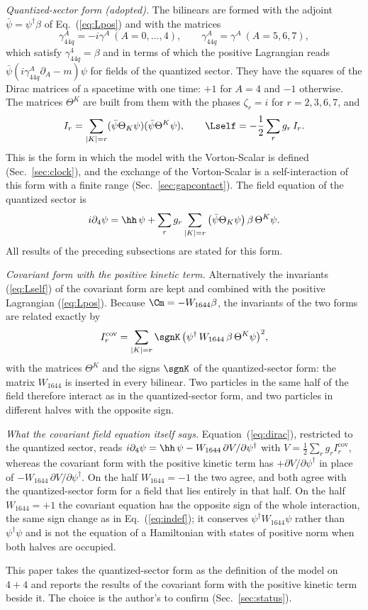 \emph{Quantized-sector form (adopted).} The bilinears are formed with the adjoint
$\bar\psi=\psi^\dagger\beta$ of Eq.~(\ref{eq:Lpos}) and with the matrices
\begin{equation}
\gamma_{44q}^{A}=-i\gamma^{A}\ (A=0,\dots,4),\qquad\gamma_{44q}^{A}=\gamma^{A}\ (A=5,6,7),
\label{eq:gq}
\end{equation}
which satisfy $\gamma_{44q}^{4}=\beta$ and in terms of which the positive Lagrangian reads
$\bar\psi(i\gamma_{44q}^{A}\partial_A-m)\psi$ for fields of the quantized sector. They have the squares
of the Dirac matrices of a spacetime with one time: $+1$ for $A=4$ and $-1$ otherwise. The matrices
$\Theta^{K}$ are built from them with the phases $\zeta_r=i$ for $r=2,3,6,7$, and
\begin{equation}
I_r=\sum_{|K|=r}(\bar\psi\Theta_K\psi)(\bar\psi\Theta^{K}\psi),\qquad\Lself=-\frac12\sum_rg_r\,I_r .
\label{eq:LselfQ}
\end{equation}
This is the form in which the model with the Vorton-Scalar is defined (Sec.~\ref{sec:clock}), and
the exchange of the Vorton-Scalar is a self-interaction of this form with a finite range
(Sec.~\ref{sec:gapcontact}). The field equation of the quantized sector is
\begin{equation}
i\partial_4\psi=\hh\,\psi+\sum_rg_r\sum_{|K|=r}\big(\bar\psi\Theta_K\psi\big)\,\beta\,\Theta^{K}\psi .
\label{eq:fieldQ}
\end{equation}
All results of the preceding subsections are stated for this form.

\emph{Covariant form with the positive kinetic term.} Alternatively the invariants (\ref{eq:Lself}) of
the covariant form are kept and combined with the positive Lagrangian (\ref{eq:Lpos}). Because
$\Cm=-W_{1644}\beta$, the invariants of the two forms are related exactly by
\begin{equation}
I_r^{\mathrm{cov}}=\sum_{|K|=r}\sgnK\,\big(\psi^\dagger\,W_{1644}\,\beta\,\Theta^{K}\psi\big)^{2},
\label{eq:forms}
\end{equation}
with the matrices $\Theta^{K}$ and the signs $\sgnK$ of the quantized-sector form: the matrix
$W_{1644}$ is inserted in every bilinear. Two particles in the same half of the field therefore
interact as in the quantized-sector form, and two particles in different halves with the opposite
sign.

\emph{What the covariant field equation itself says.} Equation~(\ref{eq:dirac}), restricted to the
quantized sector, reads $i\partial_4\psi=\hh\,\psi-W_{1644}\,\partial V/\partial\psi^\dagger$ with
$V=\tfrac12\sum_rg_rI_r^{\mathrm{cov}}$, whereas the covariant form with the positive kinetic term has
$+\partial V/\partial\psi^\dagger$ in place of $-W_{1644}\,\partial V/\partial\psi^\dagger$. On the half
$W_{1644}=-1$ the two agree, and both agree with the quantized-sector form for a field that lies
entirely in that half. On the half $W_{1644}=+1$ the covariant equation has the opposite sign of the
whole interaction, the same sign change as in Eq.~(\ref{eq:indef}); it conserves
$\psi^\dagger W_{1644}\psi$ rather than $\psi^\dagger\psi$ and is not the equation of a Hamiltonian
with states of positive norm when both halves are occupied.

This paper takes the quantized-sector form as the definition of the model on $4+4$ and reports the
results of the covariant form with the positive kinetic term beside it. The choice is the author's
to confirm (Sec.~\ref{sec:status}).
